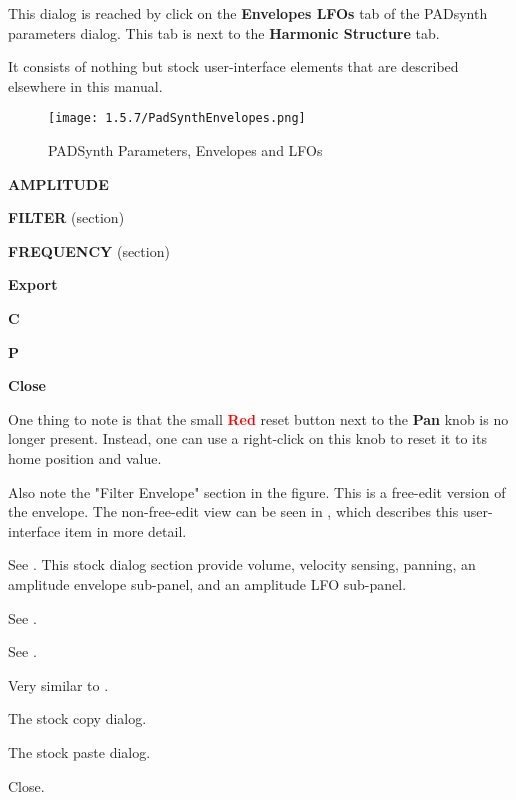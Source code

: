    This dialog is reached by click on the \textbf{Envelopes LFOs}
   tab of the PADsynth parameters dialog.  This tab is next to the
   \textbf{Harmonic Structure} tab.

   It consists of nothing but stock user-interface elements that are described
   elsewhere in this manual.

\begin{figure}[H]
   \centering
   \texttt{[image: 1.5.7/PadSynthEnvelopes.png]}
   \caption{PADSynth Parameters, Envelopes and LFOs}
   \label{fig:padsynth_parameters_envelopes_and_lfos}
\end{figure}

   \begin{enumber}
      \item \textbf{AMPLITUDE}
      \item \textbf{FILTER} (section)
      \item \textbf{FREQUENCY} (section)
      \item \textbf{Export}
      \item \textbf{C}
      \item \textbf{P}
      \item \textbf{Close}
   \end{enumber}

   One thing to note is that the small \textbf{\textcolor{red}{Red}}
   reset button next to the \textbf{Pan} knob is no longer present.  Instead,
   one can use a right-click on this knob to reset it to its home position and
   value.

   Also note the "Filter Envelope" section in the figure.  This is a free-edit
   version of the envelope.  The non-free-edit view can be seen in
   , which describes this user-interface item in more
   detail.

   See .
   This stock dialog section provide volume, velocity sensing, panning, an
   amplitude envelope sub-panel, and an amplitude LFO sub-panel.

   See .

   See .

   Very similar to
   .

   The stock copy dialog.

   The stock paste dialog.

   Close.


